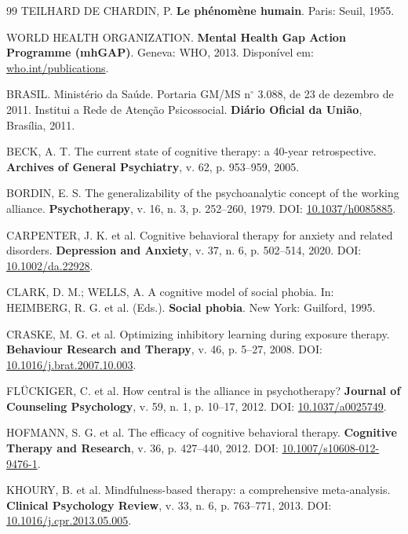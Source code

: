 \documentclass[12pt,a4paper]{article}
\begin{document}
\begin{thebibliography}{99}
TEILHARD DE CHARDIN, P. \textbf{Le phénomène humain}. Paris: Seuil, 1955.

WORLD HEALTH ORGANIZATION. \textbf{Mental Health Gap Action Programme (mhGAP)}. Geneva: WHO, 2013.
Disponível em: \href{https://www.who.int/publications/i/item/9789241506206}{who.int/publications}.

BRASIL. Ministério da Saúde. Portaria GM/MS n$^{\circ}$ 3.088, de 23 de dezembro de 2011. Institui a Rede de Atenção Psicossocial. \textbf{Diário Oficial da União}, Brasília, 2011.

BECK, A. T. The current state of cognitive therapy: a 40-year retrospective. \textbf{Archives of General Psychiatry}, v. 62, p. 953--959, 2005.

BORDIN, E. S. The generalizability of the psychoanalytic concept of the working alliance. \textbf{Psychotherapy}, v. 16, n. 3, p. 252--260, 1979.
DOI: \href{https://doi.org/10.1037/h0085885}{10.1037/h0085885}.

CARPENTER, J. K. et al. Cognitive behavioral therapy for anxiety and related disorders. \textbf{Depression and Anxiety}, v. 37, n. 6, p. 502--514, 2020.
DOI: \href{https://doi.org/10.1002/da.22928}{10.1002/da.22928}.

CLARK, D. M.; WELLS, A. A cognitive model of social phobia. In: HEIMBERG, R. G. et al. (Eds.). \textbf{Social phobia}. New York: Guilford, 1995.

CRASKE, M. G. et al. Optimizing inhibitory learning during exposure therapy. \textbf{Behaviour Research and Therapy}, v. 46, p. 5--27, 2008.
DOI: \href{https://doi.org/10.1016/j.brat.2007.10.003}{10.1016/j.brat.2007.10.003}.

FLÜCKIGER, C. et al. How central is the alliance in psychotherapy? \textbf{Journal of Counseling Psychology}, v. 59, n. 1, p. 10--17, 2012.
DOI: \href{https://doi.org/10.1037/a0025749}{10.1037/a0025749}.

HOFMANN, S. G. et al. The efficacy of cognitive behavioral therapy. \textbf{Cognitive Therapy and Research}, v. 36, p. 427--440, 2012.
DOI: \href{https://doi.org/10.1007/s10608-012-9476-1}{10.1007/s10608-012-9476-1}.

KHOURY, B. et al. Mindfulness-based therapy: a comprehensive meta-analysis. \textbf{Clinical Psychology Review}, v. 33, n. 6, p. 763--771, 2013.
DOI: \href{https://doi.org/10.1016/j.cpr.2013.05.005}{10.1016/j.cpr.2013.05.005}.


\end{thebibliography}
\end{document}
